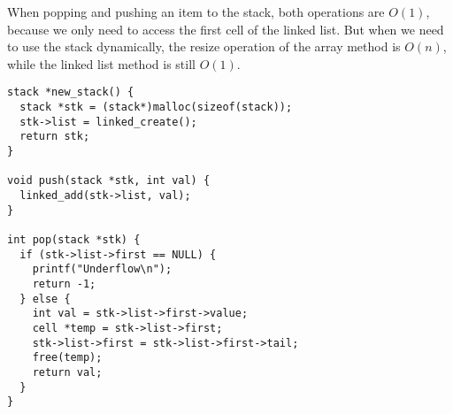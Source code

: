\documentclass[a4paper,11pt]{article}
\begin{document}
When popping and pushing an item to the stack, both operations are $O(1)$, because we only need to access the first cell of the linked list.
But when we need to use the stack dynamically, the resize operation of the array method is $O(n)$, while the linked list method is still $O(1)$.
\begin{verbatim}
stack *new_stack() {
  stack *stk = (stack*)malloc(sizeof(stack));
  stk->list = linked_create();
  return stk;
}

void push(stack *stk, int val) {
  linked_add(stk->list, val);
}

int pop(stack *stk) {
  if (stk->list->first == NULL) {
    printf("Underflow\n");
    return -1;
  } else {
    int val = stk->list->first->value;
    cell *temp = stk->list->first;
    stk->list->first = stk->list->first->tail;
    free(temp);
    return val;
  }
}
\end{verbatim}
\end{document}
